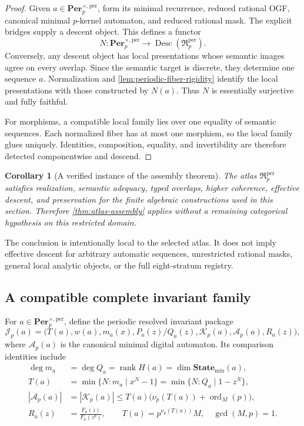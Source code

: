 \documentclass[11pt]{article}
\newtheorem{corollary}[theorem]{Corollary}
\theoremstyle{definition}
\theoremstyle{remark}
\DeclareMathOperator{\Desc}{Desc}
\DeclareMathOperator{\rank}{rank}
\newcommand{\State}{\mathbf{State}}
\newcommand{\Per}{\mathbf{Per}}
\begin{document}
\begin{proof}
Given \(a\in\Per_p^{\times,\mathrm{per}}\), form its minimal recurrence, reduced rational OGF, canonical minimal \(p\)-kernel automaton, and reduced rational mask.  The explicit bridges supply a descent object.  This defines a functor
\[
N:\Per_p^{\times,\mathrm{per}}
\longrightarrow
\Desc(\mathfrak R_p^{\mathrm{per}}).
\]
Conversely, any descent object has local presentations whose semantic images agree on every overlap.  Since the semantic target is discrete, they determine one sequence \(a\).  Normalization and \cref{lem:periodic-fiber-rigidity} identify the local presentations with those constructed by \(N(a)\).  Thus \(N\) is essentially surjective and fully faithful.

For morphisms, a compatible local family lies over one equality of semantic sequences.  Each normalized fiber has at most one morphism, so the local family glues uniquely.  Identities, composition, equality, and invertibility are therefore detected componentwise and descend.
\end{proof}

\begin{corollary}[A verified instance of the assembly theorem]
The atlas \(\mathfrak R_p^{\mathrm{per}}\) satisfies realization, semantic adequacy, typed overlaps, higher coherence, effective descent, and preservation for the finite algebraic constructions used in this section.  Therefore \cref{thm:atlas-assembly} applies without a remaining categorical hypothesis on this restricted domain.
\end{corollary}

The conclusion is intentionally local to the selected atlas.  It does not imply effective descent for arbitrary automatic sequences, unrestricted rational masks, general local analytic objects, or the full eight-stratum registry.

\subsection{A compatible complete invariant family}

For \(a\in\Per_p^{\times,\mathrm{per}}\), define the periodic resolved invariant package
\begin{equation}
\label{eq:periodic-invariant-package}
\mathcal J_p(a)
=
\bigl(
T(a),
 w(a),
 m_a(x),
 P_a(z)/Q_a(z),
 \mathcal K_p(a),
 \mathcal A_p(a),
 R_a(z)
\bigr),
\end{equation}
where \(\mathcal A_p(a)\) is the canonical minimal digital automaton.  Its comparison identities include
\begin{equation}
\label{eq:periodic-invariant-identities}
\begin{aligned}
\deg m_a
&=\deg Q_a
=\rank H(a)
=\dim \State_{\min}(a),\\
T(a)
&=\min\{N:m_a\mid x^N-1\}
=\min\{N:Q_a\mid 1-z^N\},\\
|\mathcal A_p(a)|
&=|\mathcal K_p(a)|
\leq T(a)\bigl(\nu_p(T(a))+\operatorname{ord}_{M}(p)\bigr),\\
R_a(z)
&=\frac{F_a(z)}{F_a(z^p)},
\qquad T(a)=p^{\nu_p(T(a))}M,
\quad \gcd(M,p)=1.
\end{aligned}
\end{equation}
\end{document}
